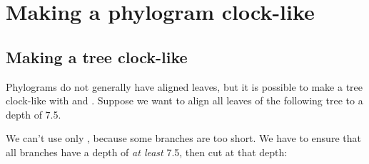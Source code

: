 
\section[sct_clocklike]{Making a phylogram clock-like}

\subsection{Making a tree clock-like}

Phylograms do not generally have aligned leaves, but it is possible to make a
tree clock-like with \luaed{} and \trim{}. Suppose we want to align all leaves
of the following tree to a depth of 7.5.



We can't use only \trim, because some branches are too short. We have to ensure
that all branches have a depth of {\em at least} 7.5, then cut at that depth:

